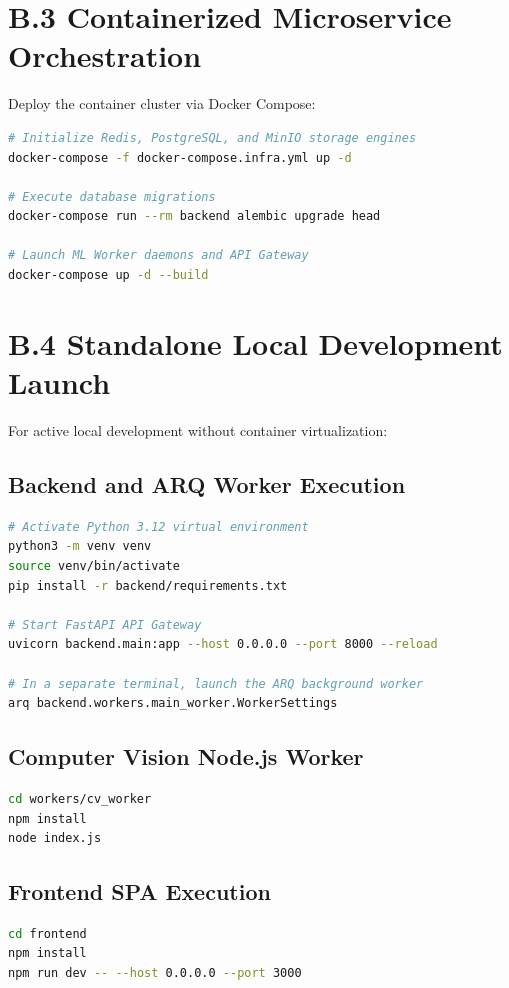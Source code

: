 \documentclass[12pt,a4paper,oneside]{report}
\begin{document}
\section*{B.3 Containerized Microservice Orchestration}
Deploy the container cluster via Docker Compose:
\begin{lstlisting}[language=bash, caption={Launching Container Infrastructure}]
# Initialize Redis, PostgreSQL, and MinIO storage engines
docker-compose -f docker-compose.infra.yml up -d

# Execute database migrations
docker-compose run --rm backend alembic upgrade head

# Launch ML Worker daemons and API Gateway
docker-compose up -d --build
\end{lstlisting}

\section*{B.4 Standalone Local Development Launch}
For active local development without container virtualization:

\subsection*{Backend and ARQ Worker Execution}
\begin{lstlisting}[language=bash, caption={Local Backend Service Launch}]
# Activate Python 3.12 virtual environment
python3 -m venv venv
source venv/bin/activate
pip install -r backend/requirements.txt

# Start FastAPI API Gateway
uvicorn backend.main:app --host 0.0.0.0 --port 8000 --reload

# In a separate terminal, launch the ARQ background worker
arq backend.workers.main_worker.WorkerSettings
\end{lstlisting}

\subsection*{Computer Vision Node.js Worker}
\begin{lstlisting}[language=bash, caption={Launching Headless CV Worker}]
cd workers/cv_worker
npm install
node index.js
\end{lstlisting}

\subsection*{Frontend SPA Execution}
\begin{lstlisting}[language=bash, caption={Launching React 18 SPA}]
cd frontend
npm install
npm run dev -- --host 0.0.0.0 --port 3000
\end{lstlisting}
\end{document}
